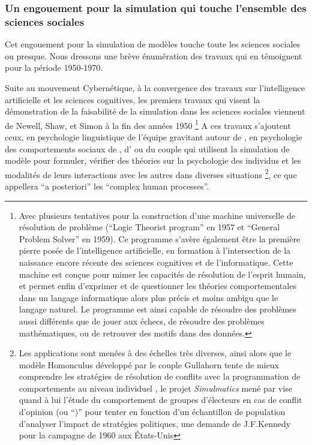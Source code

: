 \subsubsection{Un engouement pour la simulation qui touche l'ensemble des sciences sociales}
\label{ssec:engouement_sciencesociale}

Cet engouement pour la simulation de modèles touche toute les sciences sociales ou presque. Nous dressons une brève énumération des travaux qui en témoignent pour la période 1950-1970.

Suite au mouvement Cybernétique, à la convergence des travaux sur l'intelligence artificielle et les sciences cognitives, les premiers travaux qui visent la démonstration de la faisabilité de la simulation dans les sciences sociales viennent de Newell, Shaw, et Simon à la fin des années 1950 \autocite{Gullahorn1965} \footnote{Avec plusieurs tentatives pour la construction d'une machine universelle de résolution de problème (\foreignquote{english}{Logic Theorist program} en 1957 et \foreignquote{english}{General Problem Solver} en 1959). Ce programme s'avère également être la première pierre posée de l'intelligence artificielle, en formation à l'intersection de la naissance encore récente des sciences cognitives et de l'informatique. Cette machine est conçue pour mimer les capacités de résolution de l'esprit humain, et permet enfin d'exprimer et de questionner les théories comportementales dans un langage informatique alors plus précis et moins ambigu que le langage naturel. Le programme est ainsi capable de résoudre des problèmes aussi différents que de jouer aux échecs, de résoudre des problèmes mathématiques, ou de retrouver des motifs dans des données.} A ces travaux s'ajoutent ceux, en psychologie linguistique de l'équipe gravitant autour de \textcite[280-416]{Borko1962}, en psychologie des comportements sociaux de \textcite{Hovland1960}, d'\textcite{Abelson1961, Abelson1968} ou du couple \autocite{Gullahorn1965a} qui utilisent la simulation de modèle pour formuler, vérifier des théories sur la psychologie des individus et les modalités de leurs interactions avec les autres dans diverses situations \footnote{Les applications sont menées à des échelles très diverses, ainsi alors que le modèle Homonculus développé par le couple Gullahorn tente de mieux comprendre les stratégies de résolution de conflits avec la programmation de comportements au niveau individuel \autocite{Gullahorn1965}, le projet \textit{Simulmatics} mené par \textcite{Abelson1961} vise quand à lui l'étude du comportement de groupes d'électeurs en cas de conflit d'opinion (ou \foreignquote{cross-pressure}) pour tenter en fonction d'un échantillon de population d'analyser l'impact de stratégies politiques, une demande de J.F.Kennedy pour la campagne de 1960 aux États-Unis}, ce que \textcite{Ostrom1988} appellera \foreignquote{latin}{a posteriori} les \foreignquote{english}{complex human processes}.

